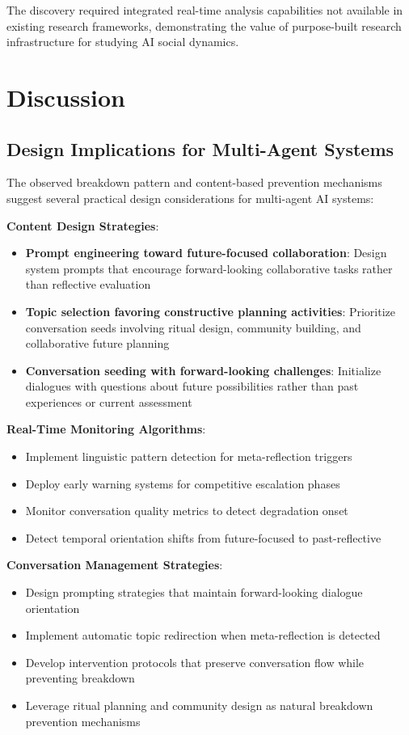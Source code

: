 \documentclass[11pt,letterpaper]{article}
\begin{document}
The discovery required integrated real-time analysis capabilities not available in existing research frameworks, demonstrating the value of purpose-built research infrastructure for studying AI social dynamics.

\section{Discussion}

\subsection{Design Implications for Multi-Agent Systems}

The observed breakdown pattern and content-based prevention mechanisms suggest several practical design considerations for multi-agent AI systems:

\textbf{Content Design Strategies}:
\begin{itemize}
    \item \textbf{Prompt engineering toward future-focused collaboration}: Design system prompts that encourage forward-looking collaborative tasks rather than reflective evaluation
    \item \textbf{Topic selection favoring constructive planning activities}: Prioritize conversation seeds involving ritual design, community building, and collaborative future planning
    \item \textbf{Conversation seeding with forward-looking challenges}: Initialize dialogues with questions about future possibilities rather than past experiences or current assessment
\end{itemize}

\textbf{Real-Time Monitoring Algorithms}:
\begin{itemize}
    \item Implement linguistic pattern detection for meta-reflection triggers
    \item Deploy early warning systems for competitive escalation phases
    \item Monitor conversation quality metrics to detect degradation onset
    \item Detect temporal orientation shifts from future-focused to past-reflective
\end{itemize}

\textbf{Conversation Management Strategies}:
\begin{itemize}
    \item Design prompting strategies that maintain forward-looking dialogue orientation
    \item Implement automatic topic redirection when meta-reflection is detected
    \item Develop intervention protocols that preserve conversation flow while preventing breakdown
    \item Leverage ritual planning and community design as natural breakdown prevention mechanisms
\end{itemize}
\end{document}

